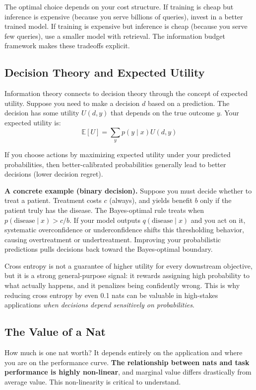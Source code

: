 The optimal choice depends on your cost structure. If training is cheap but inference is expensive (because you serve billions of queries), invest in a better trained model. If training is expensive but inference is cheap (because you serve few queries), use a smaller model with retrieval. The information budget framework makes these tradeoffs explicit.

\subsection{Decision Theory and Expected Utility}

Information theory connects to decision theory through the concept of expected utility. Suppose you need to make a decision $d$ based on a prediction. The decision has some utility $U(d, y)$ that depends on the true outcome $y$. Your expected utility is:
\begin{equation}
\mathbb{E}[U] = \sum_{y} p(y \mid x) U(d, y)
\end{equation}

If you choose actions by maximizing expected utility under your predicted probabilities, then better-calibrated probabilities generally lead to better decisions (lower decision regret).

\textbf{A concrete example (binary decision).} Suppose you must decide whether to treat a patient. Treatment costs $c$ (always), and yields benefit $b$ only if the patient truly has the disease. The Bayes-optimal rule treats when $p(\text{disease}\mid x) > c/b$. If your model outputs $q(\text{disease}\mid x)$ and you act on it, systematic overconfidence or underconfidence shifts this thresholding behavior, causing overtreatment or undertreatment. Improving your probabilistic predictions pulls decisions back toward the Bayes-optimal boundary.

Cross entropy is not a guarantee of higher utility for every downstream objective, but it is a strong general-purpose signal: it rewards assigning high probability to what actually happens, and it penalizes being confidently wrong. This is why reducing cross entropy by even 0.1 nats can be valuable in high-stakes applications \emph{when decisions depend sensitively on probabilities}.

\subsection{The Value of a Nat}

How much is one nat worth? It depends entirely on the application and where you are on the performance curve. \textbf{The relationship between nats and task performance is highly non-linear}, and marginal value differs drastically from average value. This non-linearity is critical to understand.

